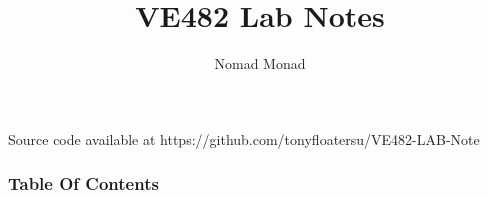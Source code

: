\documentclass[slidestop,compress,mathserif]{beamer}
\title{VE482 Lab Notes}
\author{Nomad Monad}
\institute{VE482 AU18 TA Group}
\begin{document}
	\begin{frame} %
	\titlepage
	\tiny{Source code available at https://github.com/tonyfloatersu/VE482-LAB-Note}
	\end{frame}

	\begin{frame}[allowframebreaks]
		\small
		\frametitle{Table Of Contents}
		\tableofcontents
	\end{frame}
	
\end{document}
